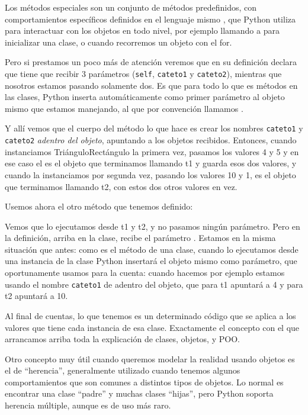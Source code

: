\begin{info}
Los métodos especiales son un conjunto de métodos predefinidos, con comportamientos específicos definidos en el lenguaje mismo \cite{metodos_especiales}, que Python utiliza para interactuar con los objetos en todo nivel, por ejemplo llamando a  para inicializar una clase, o  cuando recorremos un objeto con el {for}.
\end{info}

Pero si prestamos un poco más de atención veremos que en su definición  declara que tiene que recibir 3 parámetros (\verb|self|, \verb|cateto1| y \verb|cateto2|), mientras que nosotros estamos pasando solamente dos. Es que para todo lo que es métodos en las clases, Python inserta automáticamente como primer parámetro al objeto mismo que estamos manejando, al que por convención llamamos .

Y allí vemos que el cuerpo del método  lo que hace es crear los nombres \verb|cateto1| y \verb|cateto2| \textit{adentro del objeto}, apuntando a los objetos recibidos. Entonces, cuando instanciamos TriánguloRectángulo la primera vez, pasamos los valores 4 y 5 y en ese caso el  es el objeto que terminamos llamando t1 y guarda esos dos valores, y cuando la instanciamos por segunda vez, pasando los valores 10 y 1,  es el objeto que terminamos llamando t2, con estos dos otros valores en vez.

Usemos ahora el otro método que tenemos definido:


Vemos que lo ejecutamos desde t1 y t2, y no pasamos ningún parámetro. Pero en la definición, arriba en la clase, recibe el parámetro . Estamos en la misma situación que antes: como es el método de una clase, cuando lo ejecutamos desde una instancia de la clase Python insertará el objeto mismo como parámetro, que oportunamente usamos para la cuenta: cuando hacemos por ejemplo  estamos usando el nombre \verb|cateto1| de adentro del objeto, que para t1 apuntará a 4 y para t2 apuntará a 10. 

Al final de cuentas, lo que tenemos es un determinado código que se aplica a los valores que tiene cada instancia de esa clase. Exactamente el concepto con el que arrancamos arriba toda la explicación de clases, objetos, y POO.

Otro concepto muy útil cuando queremos modelar la realidad usando objetos es el de ``herencia'', generalmente utilizado cuando tenemos algunos comportamientos que son comunes a distintos tipos de objetos. Lo normal es encontrar una clase ``padre'' y muchas clases ``hijas'', pero Python soporta herencia múltiple, aunque es de uso más raro.

